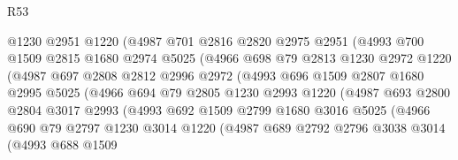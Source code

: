 \begin{lexlean}{R53}
\begin{coremodule}
                    @1230
                    @2951
                    @1220
                    (@4987
                      @701
                      @2816
                      @2820
                      @2975
                      @2951
                      (@4993
                        @700
                        @1509
                        @2815
                        @1680
                        @2974
                        @5025
                        (@4966
                          @698
                          @79
                          @2813
                          @1230
                          @2972
                          @1220
                          (@4987
                            @697
                            @2808
                            @2812
                            @2996
                            @2972
                            (@4993
                              @696
                              @1509
                              @2807
                              @1680
                              @2995
                              @5025
                              (@4966
                                @694
                                @79
                                @2805
                                @1230
                                @2993
                                @1220
                                (@4987
                                  @693
                                  @2800
                                  @2804
                                  @3017
                                  @2993
                                  (@4993
                                    @692
                                    @1509
                                    @2799
                                    @1680
                                    @3016
                                    @5025
                                    (@4966
                                      @690
                                      @79
                                      @2797
                                      @1230
                                      @3014
                                      @1220
                                      (@4987
                                        @689
                                        @2792
                                        @2796
                                        @3038
                                        @3014
                                        (@4993
                                          @688
                                          @1509

\end{coremodule}
\end{lexlean}
